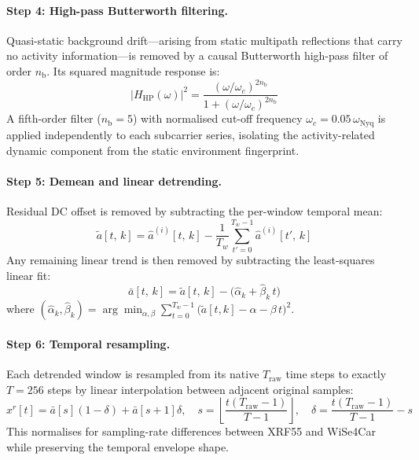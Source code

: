\documentclass[english,bibtex]{kththesis}
\begin{document}
\paragraph{Step 4: High-pass Butterworth filtering.}
Quasi-static background drift---arising from static multipath reflections that carry no activity information---is removed by a causal Butterworth high-pass filter of order $n_\text{b}$. Its squared magnitude response is:
\begin{equation}
  |H_\text{HP}(\omega)|^2 = \frac{(\omega/\omega_c)^{2n_\text{b}}}{1 + (\omega/\omega_c)^{2n_\text{b}}}
\end{equation}
A fifth-order filter ($n_\text{b} = 5$) with normalised cut-off frequency $\omega_c = 0.05\,\omega_\text{Nyq}$ is applied independently to each subcarrier series, isolating the activity-related dynamic component from the static environment fingerprint.

\paragraph{Step 5: Demean and linear detrending.}
Residual DC offset is removed by subtracting the per-window temporal mean:
\begin{equation}
  \tilde{a}[t,\,k]
    = \hat{a}^{(i)}[t,\,k]
      - \frac{1}{T_w}\sum_{t'=0}^{T_w-1}\hat{a}^{(i)}[t',\,k]
\end{equation}
Any remaining linear trend is then removed by subtracting the least-squares linear fit:
\begin{equation}
  \bar{a}[t,\,k] = \tilde{a}[t,\,k] - \bigl(\hat{\alpha}_k + \hat{\beta}_k\,t\bigr)
\end{equation}
where $(\hat{\alpha}_k,\hat{\beta}_k) = \arg\min_{\alpha,\beta}\sum_{t=0}^{T_w-1}\!\bigl(\tilde{a}[t,k]-\alpha-\beta\,t\bigr)^2$.

\paragraph{Step 6: Temporal resampling.}
Each detrended window is resampled from its native $T_\text{raw}$ time steps to exactly $T = 256$ steps by linear interpolation between adjacent original samples:
\begin{equation}
  x^r[t] = \bar{a}\!\left[s\right](1-\delta) + \bar{a}\!\left[s{+}1\right]\delta,
  \quad s = \left\lfloor\frac{t(T_\text{raw}{-}1)}{T{-}1}\right\rfloor,
  \quad \delta = \frac{t(T_\text{raw}{-}1)}{T{-}1} - s
\end{equation}
This normalises for sampling-rate differences between XRF55 and WiSe4Car while preserving the temporal envelope shape.
\end{document}
